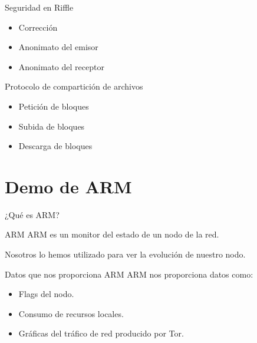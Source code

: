 \documentclass[10pt]{beamer}
\begin{document}
\begin{frame}{Seguridad en Riffle}
	\pause
	\begin{itemize}
		\item <1-> Corrección \pause
		\item <2-> Anonimato del emisor \pause
		\item <3-> Anonimato del receptor
	\end{itemize}
\end{frame}

\begin{frame}{Protocolo de compartición de archivos}
	\pause
	\begin{itemize}
		\item <1-> Petición de bloques \pause
		\item <2-> Subida de bloques \pause
		\item <3-> Descarga de bloques 	
	\end{itemize}
\end{frame}

\section{Demo de ARM}

\begin{frame}[fragile]{¿Qué es ARM?}
	\pause
	\begin{block}{ARM}
		ARM es un monitor del estado de un nodo de la red.
	\end{block}
	\pause
	Nosotros lo hemos utilizado para ver la evolución de nuestro nodo.
\end{frame}

\begin{frame}[fragile]{Datos que nos proporciona ARM}
	\pause
	ARM nos proporciona datos como:
	\pause
	\begin{itemize}
		\item<1-> Flags del nodo.\pause
		\item<2-> Consumo de recursos locales.\pause
		\item<2-> Gráficas del tráfico de red producido por Tor.\pause
	\end{itemize}
\end{frame}
\end{document}
